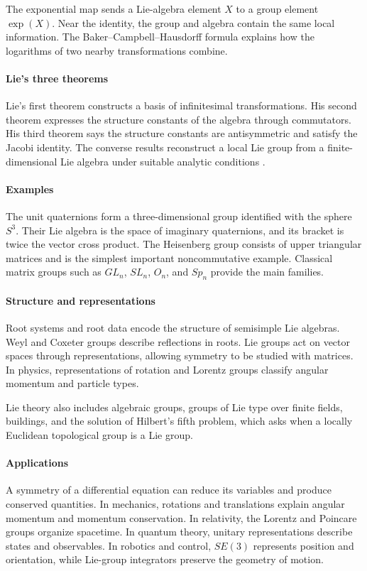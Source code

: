 The exponential map sends a Lie-algebra element $X$ to a group element $\exp(X)$. Near the identity, the group and algebra contain the same local information. The Baker--Campbell--Hausdorff formula explains how the logarithms of two nearby transformations combine.

\paragraph{Lie's three theorems}
Lie's first theorem constructs a basis of infinitesimal transformations. His second theorem expresses the structure constants of the algebra through commutators. His third theorem says the structure constants are antisymmetric and satisfy the Jacobi identity. The converse results reconstruct a local Lie group from a finite-dimensional Lie algebra under suitable analytic conditions \cite{lie_theory_ref2}.

\paragraph{Examples}
The unit quaternions form a three-dimensional group identified with the sphere $S^3$. Their Lie algebra is the space of imaginary quaternions, and its bracket is twice the vector cross product. The Heisenberg group consists of upper triangular matrices and is the simplest important noncommutative example. Classical matrix groups such as $GL_n$, $SL_n$, $O_n$, and $Sp_n$ provide the main families.

\paragraph{Structure and representations}
Root systems and root data encode the structure of semisimple Lie algebras. Weyl and Coxeter groups describe reflections in roots. Lie groups act on vector spaces through representations, allowing symmetry to be studied with matrices. In physics, representations of rotation and Lorentz groups classify angular momentum and particle types.

Lie theory also includes algebraic groups, groups of Lie type over finite fields, buildings, and the solution of Hilbert's fifth problem, which asks when a locally Euclidean topological group is a Lie group.

\paragraph{Applications}
A symmetry of a differential equation can reduce its variables and produce conserved quantities. In mechanics, rotations and translations explain angular momentum and momentum conservation. In relativity, the Lorentz and Poincare groups organize spacetime. In quantum theory, unitary representations describe states and observables. In robotics and control, $SE(3)$ represents position and orientation, while Lie-group integrators preserve the geometry of motion.

